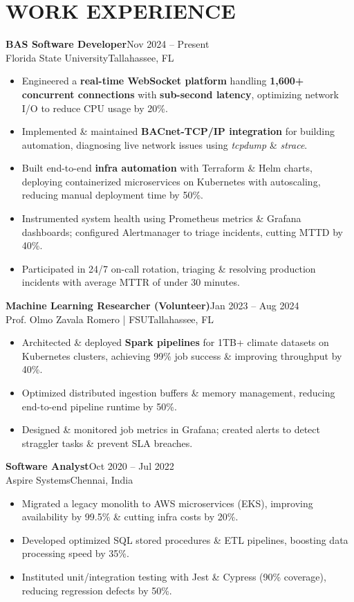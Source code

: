 \documentclass[letterpaper,10pt]{article}
\newcommand{\resumeItem}[1]{\item\small#1}
\newcommand{\resumeSubheading}[4]{%
  \vspace{6pt}\noindent
  \textbf{#1}\hfill{\footnotesize#2}\\[-1pt]
  \noindent\small#3\hfill{\small#4}\vspace{3pt}
}
\newcommand{\resumeItemsStart}{\vspace{-2pt}\begin{itemize}}
\newcommand{\resumeItemsEnd}{\end{itemize}\vspace{6pt}}
\begin{document}
\section{\textcolor{metablue}{WORK EXPERIENCE}}
\small
\vspace{-12pt}

\resumeSubheading{BAS Software Developer}{Nov 2024 -- Present}{Florida State University}{Tallahassee, FL}
\resumeItemsStart
  \resumeItem{Engineered a \textbf{real-time WebSocket platform} handling \textbf{1,600+ concurrent connections} with \textbf{sub-second latency}, optimizing network I/O to reduce CPU usage by 20\%.}
  \resumeItem{Implemented \& maintained \textbf{BACnet-TCP/IP integration} for building automation, diagnosing live network issues using \textit{tcpdump} \& \textit{strace}.}
  \resumeItem{Built end-to-end \textbf{infra automation} with Terraform \& Helm charts, deploying containerized microservices on Kubernetes with autoscaling, reducing manual deployment time by 50\%.}
  \resumeItem{Instrumented system health using Prometheus metrics \& Grafana dashboards; configured Alertmanager to triage incidents, cutting MTTD by 40\%.}
  \resumeItem{Participated in 24/7 on-call rotation, triaging \& resolving production incidents with average MTTR of under 30 minutes.}
\resumeItemsEnd
\vspace{-5pt}
\resumeSubheading{Machine Learning Researcher (Volunteer)}{Jan 2023 -- Aug 2024}{Prof. Olmo Zavala Romero | FSU}{Tallahassee, FL}
\resumeItemsStart
  \resumeItem{Architected \& deployed \textbf{Spark pipelines} for 1TB+ climate datasets on Kubernetes clusters, achieving 99\% job success \& improving throughput by 40\%.}
  \resumeItem{Optimized distributed ingestion buffers \& memory management, reducing end-to-end pipeline runtime by 50\%.}
  \resumeItem{Designed \& monitored job metrics in Grafana; created alerts to detect straggler tasks \& prevent SLA breaches.}
\resumeItemsEnd
\vspace{-5pt}
\resumeSubheading{Software Analyst}{Oct 2020 -- Jul 2022}{Aspire Systems}{Chennai, India}
\resumeItemsStart
  \resumeItem{Migrated a legacy monolith to AWS microservices (EKS), improving availability by 99.5\% \& cutting infra costs by 20\%.}
  \resumeItem{Developed optimized SQL stored procedures \& ETL pipelines, boosting data processing speed by 35\%.}
  \resumeItem{Instituted unit/integration testing with Jest \& Cypress (90\% coverage), reducing regression defects by 50\%.}
\resumeItemsEnd
\vspace{-10pt}
\end{document}
